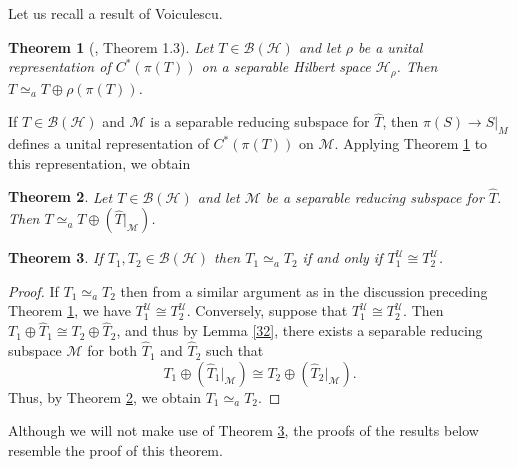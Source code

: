 \documentclass[11pt]{amsart}
\newtheorem{theorem}{Theorem}[section]
\theoremstyle{definition}
\numberwithin{equation}{section}
\begin{document}
Let us recall a result of Voiculescu.
\begin{theorem}[\cite{Voiculescu}, Theorem 1.3]\label{33}
Let $T\in\mathcal{B(H)}$ and let $\rho$ be a unital representation of $C^{*}(\pi(T))$ on a separable Hilbert space $\mathcal{H}_{\rho}$. Then $T\simeq_{a}T\oplus\rho(
\pi(T))$.
\end{theorem}
If $T\in\mathcal{B(H)}$ and $\mathcal{M}$ is a separable reducing subspace for $\widehat{T}$, then $\pi(S)\to\widehat{S}|_{M}$ defines a unital representation of $C^{*}(
\pi(T))$ on $\mathcal{M}$. Applying Theorem \ref{33} to this representation, we obtain
\begin{theorem}\label{34}
Let $T\in \mathcal{B(H)}$ and let $\mathcal{M}$ be a separable reducing subspace for $\widehat{T}$. Then $T\simeq_{a}T\oplus(\widehat{T}|_{\mathcal{M}})$.
\end{theorem}
\begin{theorem}\label{35}
If $T_{1},T_{2}\in\mathcal{B(H)}$ then $T_{1}\simeq_{a}T_{2}$ if and only if $T_{1}^{\mathscr{U}}\cong T_{2}^{\mathscr{U}}$.
\end{theorem}
\begin{proof}
If $T_{1}\simeq_{a}T_{2}$ then from a similar argument as in the discussion preceding Theorem \ref{33}, we have $T_{1}^{\mathscr{U}}\cong T_{2}^{\mathscr{U}}$. Conversely, suppose that $T_{1}^{
\mathscr{U}}\cong T_{2}^{\mathscr{U}}$. Then $T_{1}\oplus\widehat{T}_{1}\cong T_{2}\oplus\widehat{T}_{2}$, and thus by Lemma \ref{32}, there exists a separable reducing
subspace $\mathcal{M}$ for both $\widehat{T}_{1}$ and $\widehat{T}_{2}$ such that
\[T_{1}\oplus(\widehat{T}_{1}|_{\mathcal{M}})\cong T_{2}\oplus(\widehat{T}_{2}|_{\mathcal{M}}).\]
Thus, by Theorem \ref{34}, we obtain $T_{1}\simeq_{a}T_{2}$.
\end{proof}
Although we will not make use of Theorem \ref{35}, the proofs of the results below resemble the proof of this theorem.
\end{document}
